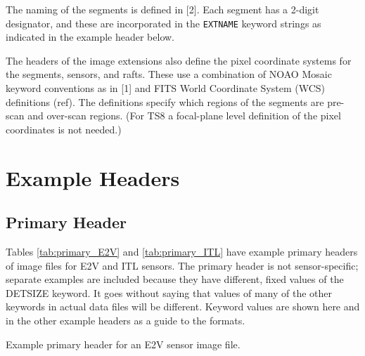 \documentclass{article}[12pt]
\newcommand{\red}{\textcolor{red}}
\begin{document}
The naming of the segments is defined in [2].  Each segment has a 2-digit designator, and these are incorporated in the {\tt EXTNAME} keyword strings as indicated in the example header below.

The headers of the image extensions also define the pixel coordinate systems for the segments, sensors, and rafts.  These use a combination of NOAO Mosaic keyword conventions as in [1] and FITS World Coordinate System (WCS) definitions (ref).  The definitions specify which regions of the segments are pre-scan and over-scan regions.  (For TS8 a focal-plane level definition of the pixel coordinates is not needed.)

\section{Example Headers}

\subsection{Primary Header}
Tables \ref{tab:primary_E2V} and \ref{tab:primary_ITL}  have example primary headers of image files for E2V and ITL sensors. The primary header is not sensor-specific; separate examples are included because they have different, fixed values of the DETSIZE keyword.  It goes without saying that values of many of the other keywords in actual data files will be different.  Keyword values are shown here and in the other example headers as a guide to the formats.


\begin{table}
\begin{alltt}

\end{alltt}
\caption{Example primary header for an E2V sensor image file.\label{tab:primary_E2V}}
\end{table}
\end{document}
